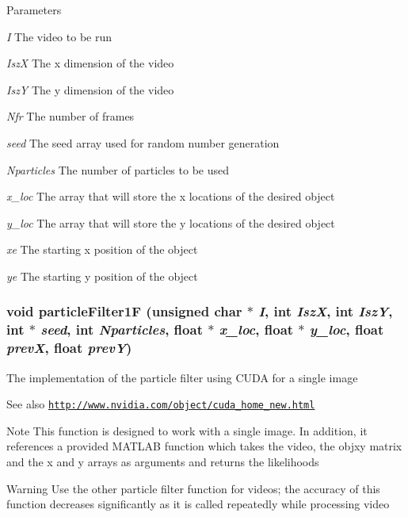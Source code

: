 \begin{DoxyParams}{Parameters}
\item[{\em I}]The video to be run \item[{\em IszX}]The x dimension of the video \item[{\em IszY}]The y dimension of the video \item[{\em Nfr}]The number of frames \item[{\em seed}]The seed array used for random number generation \item[{\em Nparticles}]The number of particles to be used \item[{\em x\_\-loc}]The array that will store the x locations of the desired object \item[{\em y\_\-loc}]The array that will store the y locations of the desired object \item[{\em xe}]The starting x position of the object \item[{\em ye}]The starting y position of the object \end{DoxyParams}
\hypertarget{ex__particle__CUDA__float_8cu_a6974c54bae46bd8f7e20eb89a5c73189}{
\subsubsection[{particleFilter1F}]{\setlength{\rightskip}{0pt plus 5cm}void particleFilter1F (unsigned char $\ast$ {\em I}, \/  int {\em IszX}, \/  int {\em IszY}, \/  int $\ast$ {\em seed}, \/  int {\em Nparticles}, \/  float $\ast$ {\em x\_\-loc}, \/  float $\ast$ {\em y\_\-loc}, \/  float {\em prevX}, \/  float {\em prevY})}}
\label{ex__particle__CUDA__float_8cu_a6974c54bae46bd8f7e20eb89a5c73189}
The implementation of the particle filter using CUDA for a single image \begin{DoxySeeAlso}{See also}
\href{http://www.nvidia.com/object/cuda_home_new.html}{\tt http://www.nvidia.com/object/cuda\_\-home\_\-new.html} 
\end{DoxySeeAlso}
\begin{DoxyNote}{Note}
This function is designed to work with a single image. In addition, it references a provided MATLAB function which takes the video, the objxy matrix and the x and y arrays as arguments and returns the likelihoods 
\end{DoxyNote}
\begin{DoxyWarning}{Warning}
Use the other particle filter function for videos; the accuracy of this function decreases significantly as it is called repeatedly while processing video 
\end{DoxyWarning}

